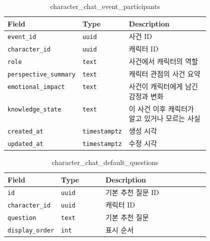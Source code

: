 \documentclass[11pt,a4paper]{article}
\renewcommand{\arraystretch}{1.18}
\begin{document}
\begin{table}[H]
\centering
\footnotesize
\setlength{\tabcolsep}{5pt}
\renewcommand{\arraystretch}{1.28}
\begin{tabularx}{\linewidth}{@{}>{\RaggedRight\arraybackslash}p{0.25\linewidth}>{\RaggedRight\arraybackslash}p{0.22\linewidth}>{\RaggedRight\arraybackslash}X@{}}
\toprule
\textbf{Field} & \textbf{Type} & \textbf{Description} \\
\midrule
\texttt{event\_\allowbreak{}id} & \texttt{uuid} & 사건 ID \\
\texttt{character\_\allowbreak{}id} & \texttt{uuid} & 캐릭터 ID \\
\texttt{role} & \texttt{text} & 사건에서 캐릭터의 역할 \\
\texttt{perspective\_\allowbreak{}summary} & \texttt{text} & 캐릭터 관점의 사건 요약 \\
\texttt{emotional\_\allowbreak{}impact} & \texttt{text} & 사건이 캐릭터에게 남긴 감정과 변화 \\
\texttt{knowledge\_\allowbreak{}state} & \texttt{text} & 이 사건 이후 캐릭터가 알고 있거나 모르는 사실 \\
\texttt{created\_\allowbreak{}at} & \texttt{timestamptz} & 생성 시각 \\
\texttt{updated\_\allowbreak{}at} & \texttt{timestamptz} & 수정 시각 \\
\bottomrule
\end{tabularx}
\caption{character\_chat\_event\_participants}
\end{table}

\begin{table}[H]
\centering
\footnotesize
\setlength{\tabcolsep}{5pt}
\renewcommand{\arraystretch}{1.28}
\begin{tabularx}{\linewidth}{@{}>{\RaggedRight\arraybackslash}p{0.25\linewidth}>{\RaggedRight\arraybackslash}p{0.22\linewidth}>{\RaggedRight\arraybackslash}X@{}}
\toprule
\textbf{Field} & \textbf{Type} & \textbf{Description} \\
\midrule
\texttt{id} & \texttt{uuid} & 기본 추천 질문 ID \\
\texttt{character\_\allowbreak{}id} & \texttt{uuid} & 캐릭터 ID \\
\texttt{question} & \texttt{text} & 기본 추천 질문 \\
\texttt{display\_\allowbreak{}order} & \texttt{int} & 표시 순서 \\
\bottomrule
\end{tabularx}
\caption{character\_chat\_default\_questions}
\end{table}
\end{document}
